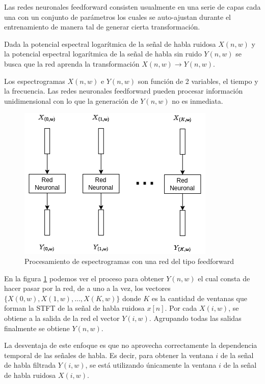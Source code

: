 Las redes neuronales feedforward consisten usualmente en una serie de capas cada una con un conjunto de parámetros los cuales se auto-ajustan durante el entrenamiento de manera tal de generar cierta transformación.

Dada la potencial espectral logarítmica de la señal de habla ruidosa $X(n, w)$ y la potencial espectral logarítmica de la señal de habla sin ruido $Y(n, w)$ se busca que la red aprenda la transformación $X(n, w) \longrightarrow Y(n, w)$. 

Los espectrogramas $X(n, w)$ e $Y(n, w)$ son función de 2 variables, el tiempo y la frecuencia. Las redes neuronales feedforward pueden procesar información unidimensional con lo que la generación de $Y(n, w)$ no es inmediata.

\begin{figure}
	\centering
	\centerline{\includegraphics[scale=0.7]{images/ch3/features-ffnn.png}}
	\caption{Procesamiento de espectrogramas con una red del tipo feedforward}
	\label{fig:ch3_features_ffnn}
\end{figure}

En la figura \ref{fig:ch3_features_ffnn} podemos ver el proceso para obtener $Y(n, w)$ el cual consta de hacer pasar por la red, de a uno a la vez, los vectores $\{X(0, w), X(1, w), ..., X(K, w) \}$ donde $K$ es la cantidad de ventanas que forman la STFT de la señal de habla ruidosa $x[n]$. Por cada $X(i, w)$, se obtiene a la salida de la red el vector $Y(i, w)$. Agrupando todas las salidas finalmente se obtiene $Y(n, w)$.

La desventaja de este enfoque es que no aprovecha correctamente la dependencia temporal de las señales de habla. Es decir, para obtener la ventana $i$ de la señal de habla filtrada $Y(i, w)$, se está utilizando únicamente la ventana $i$ de la señal de habla ruidosa $X(i, w)$. 


